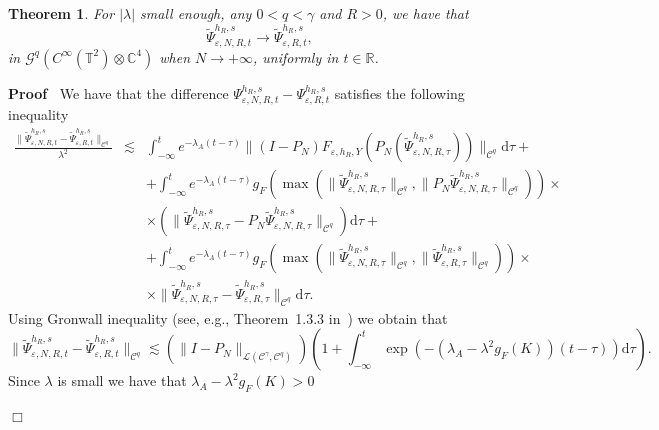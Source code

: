 \documentclass{article}
\newcommand{\mathd}{\mathrm{d}}
\newenvironment{proof}{\noindent\textbf{Proof\ }}{\hspace*{\fill}$\Box$\medskip}
\newtheorem{theorem}{Theorem}
\begin{document}
\begin{theorem}
  \label{theorem_convergence1}For $| \lambda |$ small enough, any $0 < q <
  \gamma$ and $R > 0$, we have that
  \[ \tilde{\Psi}_{\varepsilon, N, R, t}^{h_R, s} \rightarrow
     \tilde{\Psi}_{\varepsilon, R, t}^{h_R, s}, \]
  in $\mathcal{G}^q (C^{\infty} (\mathbb{T}^2) \otimes \mathbb{C}^4)$ when $N
  \rightarrow + \infty$, uniformly in $t \in \mathbb{R}$.
\end{theorem}

\begin{proof}
  We have that the difference $\Psi_{\varepsilon, N, R, t}^{h_R, s} -
  \Psi_{\varepsilon, R, t}^{h_R, s} $ satisfies the following inequality
  \begin{eqnarray}
    \frac{\| \tilde{\Psi}_{\varepsilon, N, R, t}^{h_R, s} -
    \tilde{\Psi}_{\varepsilon, R, t}^{h_R, s} \|_{\mathcal{C}^q}}{\lambda^2} &
    \lesssim & \int_{- \infty}^t e^{- \lambda_A (t - \tau)} \| (I - P_N)
    F_{\varepsilon, h_R, Y} (P_N (\tilde{\Psi}_{\varepsilon, N, R, \tau}^{h_R,
    s})) \|_{\mathcal{C}^q} \mathd \tau + \nonumber\\
    &  & + \int_{- \infty}^t e^{- \lambda_A (t - \tau)} g_F (\max (\|
    \tilde{\Psi}_{\varepsilon, N, R, \tau}^{h_R, s} \|_{\mathcal{C}^q}, \| P_N
    \tilde{\Psi}_{\varepsilon, N, R, \tau}^{h_R, s} \|_{\mathcal{C}^q}))
    \times \nonumber\\
    &  & \times (\| \tilde{\Psi}_{\varepsilon, N, R, \tau}^{h_R, s} - P_N
    \tilde{\Psi}_{\varepsilon, N, R, \tau}^{h_R, s} \|_{\mathcal{C}^q}) \mathd
    \tau + \nonumber\\
    &  & + \int_{- \infty}^t e^{- \lambda_A (t - \tau)} g_F (\max (\|
    \tilde{\Psi}_{\varepsilon, N, R, \tau}^{h_R, s} \|_{\mathcal{C}^q}, \|
    \tilde{\Psi}_{\varepsilon, R, \tau}^{h_R, s} \|_{\mathcal{C}^q})) \times
    \nonumber\\
    &  & \times \| \tilde{\Psi}_{\varepsilon, N, R, \tau}^{h_R, s} -
    \tilde{\Psi}_{\varepsilon, R, \tau}^{h_R, s} \|_{\mathcal{C}^q} \mathd
    \tau . \nonumber
  \end{eqnarray}
  Using Gronwall inequality (see, e.g., Theorem~1.3.3
  in~{\cite{Pachpatte1998}}) we obtain that
  \[ \| \tilde{\Psi}_{\varepsilon, N, R, t}^{h_R, s} -
     \tilde{\Psi}_{\varepsilon, R, t}^{h_R, s} \|_{\mathcal{C}^q} \lesssim (\|
     I - P_N \|_{\mathcal{L} (\mathcal{C}^{\gamma}, \mathcal{C}^q)}) \left( 1
     + \int_{- \infty}^t \exp (- (\lambda_A - \lambda^2 g_F (K)) (t - \tau))
     \mathd \tau \right) . \]
  Since $\lambda$ is small we have that $\lambda_A - \lambda^2 g_F (K) > 0$

\end{proof}
\end{document}
